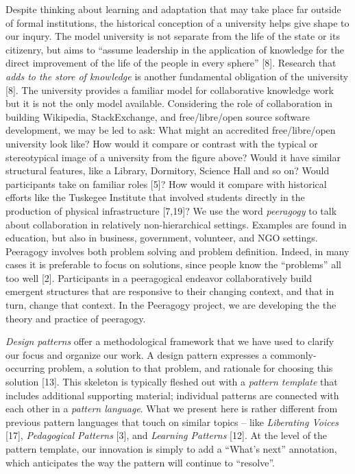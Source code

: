 Despite thinking about learning and adaptation that may take place far
outside of formal institutions, the historical conception of a
university helps give shape to our inqury. The model university is not
separate from the life of the state or its citizenry, but aims to
``assume leadership in the application of knowledge for the direct
improvement of the life of the people in every sphere'' {{[}8{]}}.
Research that \emph{adds to the store of knowledge} is another
fundamental obligation of the university {{[}8{]}}. The university
provides a familiar model for collaborative knowledge work but it is not
the only model available. Considering the role of collaboration in
building Wikipedia, StackExchange, and free/libre/open source software
development, we may be led to ask: What might an accredited
free/libre/open university look like? How would it compare or contrast
with the typical or stereotypical image of a university from the figure
above? Would it have similar structural features, like a Library,
Dormitory, Science Hall and so on? Would participants take on familiar
roles {{[}5{]}}? How would it compare with historical efforts like the
Tuskegee Institute that involved students directly in the production of
physical infrastructure {{[}7,19{]}}? We use the word \emph{peeragogy}
to talk about collaboration in relatively non-hierarchical settings.
Examples are found in education, but also in business, government,
volunteer, and NGO settings. Peeragogy involves both problem solving and
problem definition. Indeed, in many cases it is preferable to focus on
solutions, since people know the ``problems'' all too well {{[}2{]}}.
Participants in a peeragogical endeavor collaboratively build emergent
structures that are responsive to their changing context, and that in
turn, change that context. In the Peeragogy project, we are developing
the the theory and practice of peeragogy.

\emph{Design patterns} offer a methodological framework that we have
used to clarify our focus and organize our work. A design pattern
expresses a commonly-occurring problem, a solution to that problem, and
rationale for choosing this solution {{[}13{]}}. This skeleton is
typically fleshed out with a \emph{pattern template} that includes
additional supporting material; individual patterns are connected with
each other in a \emph{pattern language}. What we present here is rather
different from previous pattern languages that touch on similar topics
-- like \emph{Liberating Voices} {{[}17{]}}, \emph{Pedagogical Patterns}
{{[}3{]}}, and \emph{Learning Patterns} {{[}12{]}}. At the level of the
pattern template, our innovation is simply to add a ``What's next''
annotation, which anticipates the way the pattern will continue to
``resolve''.

